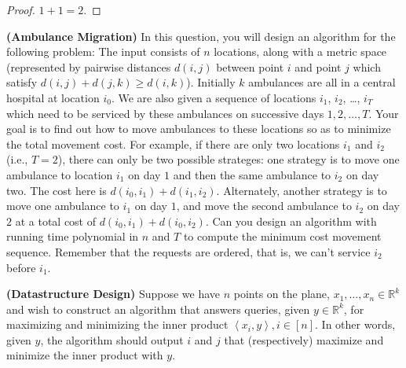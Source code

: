 \documentclass[solution,addpoints,12pt]{exam}
\newcommand{\reals}{\mathbb{R}}
\newcommand{\iprod}[1]{\left\langle #1 \right\rangle}
\begin{document}
\begin{questions}
\begin{parts}
  \begin{solution}
  \begin{proof}
  $1 + 1 = 2$.
  \end{proof}
  \end{solution}
\end{parts}

\question[15] \textbf{(Ambulance Migration)} In this question, you will design an algorithm for the following problem: The input consists of $n$ locations, along  with a metric space (represented by pairwise distances $d(i,j)$ between point $i$ and point $j$  which satisfy $d(i,j) + d(j,k) \geq d(i,k)$). Initially $k$ ambulances are all in a central hospital at location $i_0$. We are also given a sequence of locations $i_1$, $i_2$, \ldots, $i_T$ which need to be serviced by these ambulances on successive days $1, 2, \ldots, T$. Your goal is to find out how to move ambulances to these locations so as to minimize the total movement cost. For example, if there are only two locations $i_1$ and $i_2$ (i.e., $T = 2$), there can only be two possible strateges: one strategy is to move one ambulance to location $i_1$ on day $1$ and then the same ambulance to $i_2$ on day two. The cost here is $d(i_0, i_1) + d(i_1, i_2)$. Alternately, another strategy is to move one ambulance to $i_1$ on day $1$, and move the second ambulance to $i_2$ on day $2$ at a total cost of $d(i_0,i_1) + d(i_0,i_2)$. Can you design an algorithm with running time polynomial in $n$ and $T$ to compute the minimum cost movement sequence. Remember that the requests are ordered, that is, we can't service $i_2$ before $i_1$.


\question[15] \textbf{(Datastructure Design)}  Suppose we have $n$ points on the plane, $x_1, \ldots, x_n \in \reals^k$ and wish to construct an algorithm that answers queries, given $y \in \reals^k$, for maximizing and minimizing the inner product $\iprod{x_i, y}, i \in [n]$.  In other words, given $y$, the algorithm should output $i$ and $j$ that (respectively) maximize and minimize the inner product with $y$.


\end{questions}
\end{document}
